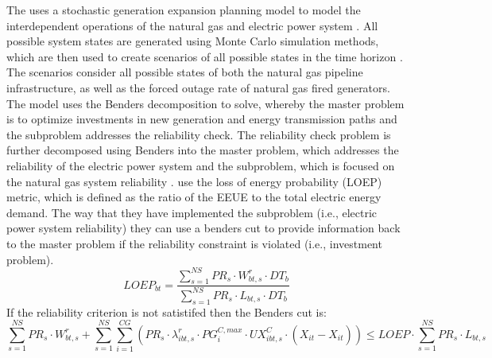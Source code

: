 \documentclass[10pt]{amsart}
\begin{document}
The uses a stochastic generation expansion planning model to model the interdependent operations of the natural gas and electric power system \parencite{pantos:2013aa}.
All possible system states are generated using Monte Carlo simulation methods, which are then used to create scenarios of all possible states in the time horizon \parencite{pantos:2013aa}. 
The scenarios consider all possible states of both the natural gas pipeline infrastructure, as well as the forced outage rate of natural gas fired generators. 
The model uses the Benders decomposition to solve, whereby the master problem is to optimize investments in new generation and energy transmission paths and the subproblem addresses the reliability check.
The reliability check problem is further decomposed using Benders into  the master problem, which addresses the reliability of the electric power system and the subproblem, which is focused on the natural gas system reliability \parencite{pantos:2013aa}. 
\cite{pantos:2013aa} use the loss of energy probability (LOEP) metric, which is defined as the ratio of the EEUE to the total electric energy demand. 
The way that they have implemented the subproblem (i.e., electric power system reliability) they can use a benders cut to provide information back to the master problem if the reliability constraint is violated (i.e., investment problem). 
\begin{equation}
LOEP_{bt} = \frac{\sum_{s=1}^{NS} PR_{s}\cdot W^{r}_{bt, s}\cdot DT_{b}}{\sum_{s=1}^{NS} PR_{s}\cdot L_{bt, s}\cdot DT_{b}}
\end{equation}
If the reliability criterion is not satistifed then the Benders cut is:
\begin{equation}
\sum_{s=1}^{NS} PR_{s}\cdot W^{r}_{bt,s} + \sum_{s=1}^{NS}\sum_{i=1}^{CG}(PR_{s}\cdot\lambda^{r}_{ibt,s}\cdot PG^{C,max}_{i}\cdot UX^{C}_{ibt,s}\cdot (X_{it}-\hat{X}_{it}))\leq LOEP\cdot \sum_{s=1}^{NS}PR_{s}\cdot L_{bt,s}
\end{equation}



\printbibliography
\end{document}
